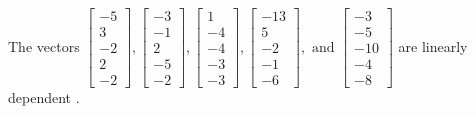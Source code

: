 \begin{exercise}
\begin{exerciseStatement}
  \end{exerciseStatement}
  \begin{exerciseAnswer}
   The vectors \(\left[\begin{array}{r}
-5 \\
3 \\
-2 \\
2 \\
-2
\end{array}\right] , \left[\begin{array}{r}
-3 \\
-1 \\
2 \\
-5 \\
-2
\end{array}\right] , \left[\begin{array}{r}
1 \\
-4 \\
-4 \\
-3 \\
-3
\end{array}\right] , \left[\begin{array}{r}
-13 \\
5 \\
-2 \\
-1 \\
-6
\end{array}\right] , \text{ and } \left[\begin{array}{r}
-3 \\
-5 \\
-10 \\
-4 \\
-8
\end{array}\right]\) are 
  	 linearly dependent  .
  


  \end{exerciseAnswer}
\end{exercise}